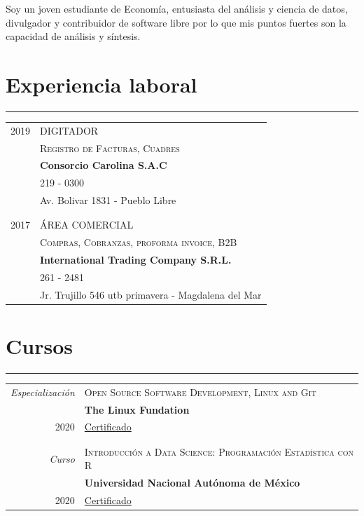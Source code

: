 \documentclass[a4paper,10pt]{article}
\newcommand{\tvspace}{\footnotesize{}\\\multicolumn{2}{c}{}}
\begin{document}
	Soy un joven estudiante de Economía, entusiasta del análisis y ciencia de datos, divulgador y contribuidor de software libre por lo que mis puntos fuertes son la capacidad de análisis y síntesis.

\section{Experiencia laboral}
	\hrule
	\begin{tabular}{r|p{11cm}}
		\textsc{2019}             & \textsc{DIGITADOR}\\
				                      & \textsc{Registro de Facturas, Cuadres}\\
				                      & \textbf{Consorcio Carolina S.A.C} \\
				                      & 219 - 0300  \\
				                      & Av. Bolivar 1831 - Pueblo Libre\\
															& \tvspace \\

		\textsc{2017}             & \textsc{ÁREA COMERCIAL}\\
				                      & \textsc{Compras, Cobranzas, proforma invoice, B2B}\\
				                      & \textbf{International Trading Company S.R.L.} \\
				                      & 261 - 2481 \\
				                      & Jr. Trujillo 546 utb primavera - Magdalena del Mar
	\end{tabular}

\newpage

\section{Cursos}
\hrule

	\begin{tabular}{r|p{11cm}}
 		\emph{Especialización}       & \textsc{Open Source Software Development, Linux and Git}\\
				                         & \textbf{The Linux Fundation}\\
		\textsc{2020}                & \href{https://www.coursera.org/verify/specialization/S9NNU5BM4SWU}{Certificado}\\
				                         & \tvspace \\

  	\emph{Curso}                 & \textsc{Introducción a Data Science: Programación Estadística con R}\\
				                         & \textbf{Universidad Nacional Autónoma de México}\\
		\textsc{2020}                & \href{https://www.coursera.org/verify/V6A9ZS2CMAP2}{Certificado}\\
	\end{tabular}
\end{document}
